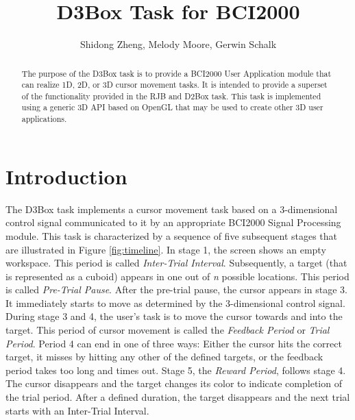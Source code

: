 \documentclass[letterpaper,oneside,12pt]{article}
\begin{document}
%
\title{D3Box Task for BCI2000}
\author{Shidong Zheng, Melody Moore, Gerwin Schalk}
\maketitle

\newpage
\tableofcontents

\newpage 

\begin{abstract}

The purpose of the D3Box task is to provide a BCI2000 User Application module 
that can realize 1D, 2D, or 3D cursor movement tasks. It is intended to 
provide a superset of the functionality provided in the RJB and D2Box task. This 
task is implemented using a generic 3D API based on OpenGL that may be used to 
create other 3D user applications. 

\end{abstract}

\section{Introduction}

The D3Box task implements a cursor movement task based on a 3-dimensional 
control signal communicated to it by an appropriate BCI2000 Signal Processing 
module. This task is characterized by a sequence of five subsequent stages that 
are illustrated in Figure \ref{fig:timeline}. In stage 1, the screen shows an 
empty workspace. This period is called \emph{Inter-Trial Interval}. 
Subsequently, a target (that is represented as a cuboid) appears in one out of 
\emph{n} possible locations. This period is called \emph{Pre-Trial Pause}. After 
the pre-trial pause, the cursor appears in stage 3. It immediately starts to 
move as determined by the 3-dimensional control signal. During stage 3 and 4,
the user's task is to move the cursor towards and into the target. This period
of cursor movement is called the \emph{Feedback Period} or \emph{Trial Period}.
Period 4 can end in one of three ways: Either the cursor hits the correct target, 
it misses by hitting any other of the defined targets, or the feedback period takes
too long and times out. Stage 5, the \emph{Reward Period}, follows stage 4.
The cursor disappears and the target changes its color to indicate completion
of the trial period. After a defined duration, the target disappears and the
next trial starts with an Inter-Trial Interval.
\end{document}
